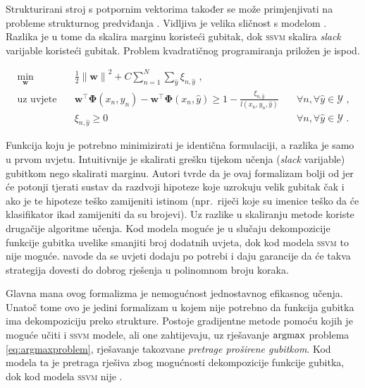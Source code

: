 Strukturirani stroj s potpornim vektorima  također se može primjenjivati na probleme strukturnog predviđanja
\citep{tsochantaridis2005large}. Vidljiva je velika sličnost s modelom \mmmm{}.
Razlika je u tome da \mmmm{} skalira marginu koristeći gubitak, dok
\textsc{ssvm} skalira \textit{slack} varijable koristeći gubitak. Problem
kvadratičnog programiranja priložen je ispod.

\begin{equation}\label{eq:ssvm}
\begin{aligned}
  \min_{\mathbf{w}} & \quad \frac{1}{2} {\lVert\mathbf{w}\lVert}^2 + C \sum_{n=1}^{N}\sum_{\hat{y}} \xi_{n,\hat{y}} \text{ ,}              & \\
  \text{uz uvjete}  & \quad \mathbf{w}^\top \mathbf{\Phi}(x_n, y_n) - \mathbf{w}^\top \mathbf{\Phi}(x_n, \hat{y}) \ge 1 - \frac{\xi_{n,\hat{y}}}{l(x_n, y_n, \hat{y})} & \quad \forall n, \forall \hat{y} \in \mathcal{Y} \text{ ,}\\
                    & \quad \xi_{n,\hat{y}} \ge 0                                                                                          & \quad \forall n, \forall \hat{y} \in \mathcal{Y} \text{ .}
\end{aligned}
\end{equation}

\noindent
Funkcija koju je potrebno minimizirati je identična \mmmm{} formulaciji, a
razlika je samo u prvom uvjetu. Intuitivnije je skalirati grešku tijekom učenja
(\textit{slack} varijable) gubitkom nego skalirati marginu. Autori tvrde da je
ovaj formalizam bolji od \mmmm{} jer će potonji tjerati sustav da razdvoji
hipoteze koje uzrokuju velik gubitak čak i ako je te hipoteze teško zamijeniti
istinom (npr.~riječi koje su imenice teško da će klasifikator ikad zamijeniti da
su brojevi). Uz razlike u skaliranju metode koriste drugačije algoritme učenja.
Kod \mmmm{} modela moguće je u slučaju dekompozicije funkcije gubitka uvelike
smanjiti broj dodatnih uvjeta, dok kod modela \textsc{ssvm} to nije moguće.
\citet{tsochantaridis2005large} navode da se uvjeti dodaju po potrebi i daju
garancije da će takva strategija dovesti do dobrog rješenja u polinomnom broju
koraka.

Glavna mana ovog formalizma je nemogućnost jednostavnog efikasnog učenja. Unatoč
tome ovo je jedini formalizam u kojem nije potrebno da funkcija gubitka ima
dekompoziciju preko strukture. Postoje gradijentne metode pomoću kojih je moguće
učiti \mmmm{} i \textsc{ssvm} modele, ali one zahtijevaju, uz rješavanje
$\operatorname*{argmax}$ problema \ref{eq:argmaxproblem}, rješavanje takozvane \textit{pretrage
proširene gubitkom}. Kod \mmmm{} modela ta je pretraga rješiva zbog mogućnosti
dekompozicije funkcije gubitka, dok kod modela \textsc{ssvm} nije
\citep{ratliff2006maximum}.
